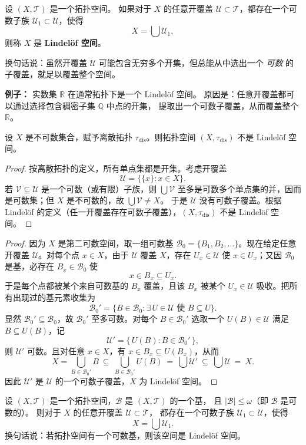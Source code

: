 \begin{definition}
设 $(X,\mathcal{T})$ 是一个拓扑空间。  
如果对于 $X$ 的任意开覆盖 $\mathcal{U} \subset \mathcal{T}$，都存在一个可数子族 
$\mathcal{U}_1 \subset \mathcal{U}$，使得
\[
X = \bigcup \mathcal{U}_1,
\]
则称 $X$ 是 \textbf{Lindelöf 空间}。

换句话说：虽然开覆盖 $\mathcal{U}$ 可能包含无穷多个开集，但总能从中选出一个
\emph{可数} 的子覆盖，就足以覆盖整个空间。

\medskip
\textbf{例子：} 实数集 $\mathbb{R}$ 在通常拓扑下是一个 Lindelöf 空间。
原因是：任意开覆盖都可以通过选择包含稠密子集 $\mathbb{Q}$ 中点的开集，
提取出一个可数子覆盖，从而覆盖整个 $\mathbb{R}$。
\end{definition}
\begin{proposition}
设 $X$ 是不可数集合，赋予离散拓扑 $\tau_{\mathrm{dis}}$。则拓扑空间 $(X,\tau_{\mathrm{dis}})$ 不是 Lindel\"of 空间。
\end{proposition}

\begin{proof}
按离散拓扑的定义，所有单点集都是开集。考虑开覆盖
\[
\mathcal{U}=\bigl\{\{x\}: x\in X\bigr\}.
\]
若 $\mathcal{V}\subseteq\mathcal{U}$ 是一个可数（或有限）子族，则
\(
\bigcup\mathcal{V}
\)
至多是可数多个单点集的并，因而是可数集；但 $X$ 是不可数的，故
\(
\bigcup\mathcal{V}\neq X
\)。
于是 $\mathcal{U}$ 没有可数子覆盖。根据 Lindel\"of 的定义（任一开覆盖存在可数子覆盖），$(X,\tau_{\mathrm{dis}})$ 不是 Lindel\"of 空间。
\end{proof}
\begin{proof}
因为 $X$ 是第二可数空间，取一组可数基 $\mathcal{B}_0=\{B_1,B_2,\dots\}$。现在给定任意开覆盖 $\mathcal{U}$。对每个点 $x\in X$，由于 $\mathcal{U}$ 覆盖 $X$，存在 $U_x\in\mathcal{U}$ 使 $x\in U_x$；又因 $\mathcal{B}_0$ 是基，必存在 $B_x\in\mathcal{B}_0$ 使
\[
x\in B_x\subseteq U_x.
\]
于是每个点都被某个来自可数基的 $B_x$ 覆盖，且该 $B_x$ 被某个 $U_x\in\mathcal{U}$ 吸收。把所有出现过的基元素收集为
\[
\mathcal{B}_0'=\{B\in\mathcal{B}_0:\exists\,U\in\mathcal{U}\text{ 使 }B\subseteq U\}.
\]
显然 $\mathcal{B}_0'\subseteq \mathcal{B}_0$，故 $\mathcal{B}_0'$ 至多可数。对每个 $B\in\mathcal{B}_0'$ 选取一个 $U(B)\in\mathcal{U}$ 满足 $B\subseteq U(B)$，记
\[
\mathcal{U}'=\{\,U(B): B\in\mathcal{B}_0'\,\},
\]
则 $\mathcal{U}'$ 可数。且对任意 $x\in X$，有 $x\in B_x\subseteq U(B_x)$，从而
\[
X=\bigcup_{B\in\mathcal{B}_0'} B\ \subseteq\ \bigcup_{B\in\mathcal{B}_0'} U(B)\ =\ \bigcup \mathcal{U}'\ \subseteq\ \bigcup \mathcal{U}\ =\ X.
\]
因此 $\mathcal{U}'$ 是 $\mathcal{U}$ 的一个可数子覆盖，$X$ 为 Lindel\"of 空间。
\end{proof}
\begin{theorem}[有可数覆盖就符合林德洛夫条件]
设 $(X,\mathcal{T})$ 是一个拓扑空间，$\mathcal{B}$ 是 $(X,\mathcal{T})$ 的一个基，
且 $\lvert \mathcal{B} \rvert \leq \omega$（即 $\mathcal{B}$ 是可数的）。
则对于 $X$ 的任意开覆盖 $\mathcal{U} \subset \mathcal{T}$，
都存在一个可数子族 $\mathcal{U}_1 \subset \mathcal{U}$，使得
\[
X = \bigcup \mathcal{U}_1.
\]
换句话说：若拓扑空间有一个可数基，则该空间是 Lindelöf 空间。
\end{theorem}

